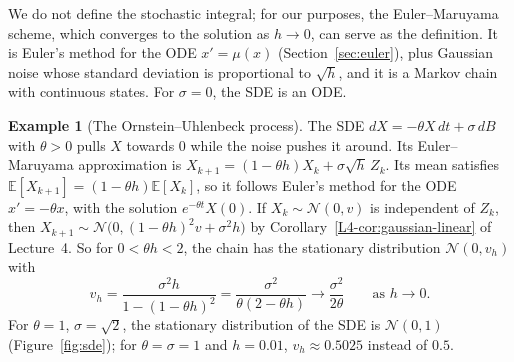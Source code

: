 \documentclass[11pt]{article}
\newcommand{\E}{\mathbb{E}}
\theoremstyle{definition}
\newtheorem{example}[definition]{Example}
\theoremstyle{plain}
\theoremstyle{remark}
\begin{document}
We do not define the stochastic integral; for our purposes, the Euler--Maruyama scheme, which converges to the solution as $h \to 0$, can serve as the definition. It is Euler's method for the ODE $x' = \mu(x)$ (Section~\ref{sec:euler}), plus Gaussian noise whose standard deviation is proportional to $\sqrt{h}$, and it is a Markov chain with continuous states. For $\sigma = 0$, the SDE is an ODE.

\begin{example}[The Ornstein--Uhlenbeck process]\label{ex:ou}
    The SDE $dX = -\theta X\,dt + \sigma\,dB$ with $\theta > 0$ pulls $X$ towards $0$ while the noise pushes it around. Its Euler--Maruyama approximation is $X_{k+1} = (1 - \theta h)X_k + \sigma\sqrt{h}\,Z_k$. Its mean satisfies $\E[X_{k+1}] = (1 - \theta h)\E[X_k]$, so it follows Euler's method for the ODE $x' = -\theta x$, with the solution $e^{-\theta t}X(0)$. If $X_k \sim \mathcal{N}(0, v)$ is independent of $Z_k$, then $X_{k+1} \sim \mathcal{N}\big(0, (1 - \theta h)^2v + \sigma^2h\big)$ by Corollary~\ref{L4-cor:gaussian-linear} of Lecture~4. So for $0 < \theta h < 2$, the chain has the stationary distribution $\mathcal{N}(0, v_h)$ with
    \[v_h = \frac{\sigma^2h}{1 - (1 - \theta h)^2} = \frac{\sigma^2}{\theta(2 - \theta h)} \to \frac{\sigma^2}{2\theta} \qquad \text{as } h \to 0.\]
    For $\theta = 1$, $\sigma = \sqrt{2}$, the stationary distribution of the SDE is $\mathcal{N}(0, 1)$ (Figure~\ref{fig:sde}); for $\theta = \sigma = 1$ and $h = 0.01$, $v_h \approx 0.5025$ instead of $0.5$.
\end{example}
\end{document}
